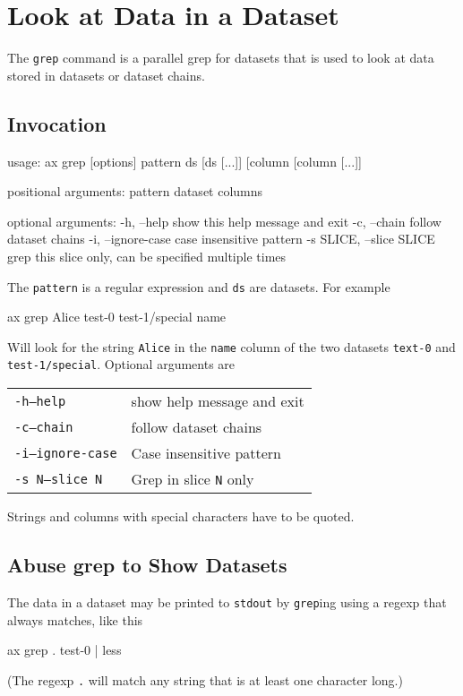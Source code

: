 \section{Look at Data in a Dataset}
The \texttt{grep} command is a parallel grep for datasets that is
used to look at data stored in datasets or dataset chains.
\subsection{Invocation}
\begin{shell}
  usage: ax grep [options] pattern ds [ds [...]] [column [column [...]]

    positional arguments:
    pattern
    dataset
    columns

    optional arguments:
    -h, --help            show this help message and exit
    -c, --chain           follow dataset chains
    -i, --ignore-case     case insensitive pattern
    -s SLICE, --slice SLICE
    grep this slice only, can be specified multiple times
\end{shell}

The \texttt{pattern} is a regular expression and \texttt{ds} are
datasets.  For example
\begin{shell}
ax grep Alice test-0 test-1/special name
\end{shell}
Will look for the string \texttt{Alice} in the \texttt{name} column of
the two datasets \texttt{text-0} and \texttt{test-1/special}.
Optional arguments are
\begin{snugshade}
  \begin{tabular}{p{4cm}p{9cm}}
      \texttt{-h}\hspace{3cm}\texttt{---help} & show help message and exit\\[4ex]
      \texttt{-c}\hspace{3cm}\texttt{---chain} & follow dataset chains\\[4ex]
      \texttt{-i}\hspace{3cm}\texttt{---ignore-case} & Case insensitive pattern\\[4ex]
      \texttt{-s N}\hspace{3cm}\texttt{---slice N} & Grep in slice \texttt{N} only\\
  \end{tabular}
\end{snugshade}
Strings and columns with special characters have to be quoted.



\subsection{Abuse grep to Show Datasets}
The data in a dataset may be printed to \texttt{stdout} by
\texttt{grep}ing using a regexp that always matches, like this
\begin{shell}
ax grep . test-0 | less
\end{shell}
(The regexp \texttt{.} will match any string that is at least one character long.)




